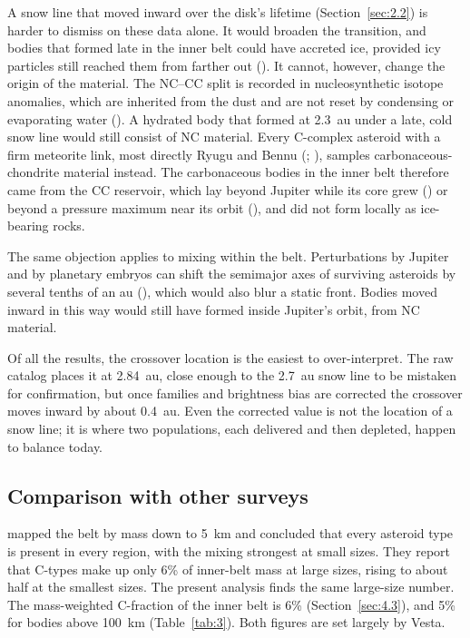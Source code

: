 \documentclass[twocolumn]{aastex701}
\begin{document}
A snow line that moved inward over the disk’s lifetime (Section~\ref{sec:2.2}) is harder to dismiss on these data alone. It would broaden the transition, and bodies that formed late in the inner belt could have accreted ice, provided icy particles still reached them from farther out (\citealt{morbidelli2016}). It cannot, however, change the origin of the material. The NC–CC split is recorded in nucleosynthetic isotope anomalies, which are inherited from the dust and are not reset by condensing or evaporating water (\citealt{kleine2020}). A hydrated body that formed at 2.3~au under a late, cold snow line would still consist of NC material. Every C-complex asteroid with a firm meteorite link, most directly Ryugu and Bennu (\citealt{yokoyama2023}; \citealt{lauretta2024}), samples carbonaceous-chondrite material instead. The carbonaceous bodies in the inner belt therefore came from the CC reservoir, which lay beyond Jupiter while its core grew (\citealt{kruijer2017}) or beyond a pressure maximum near its orbit (\citealt{brasser2020}), and did not form locally as ice-bearing rocks.

The same objection applies to mixing within the belt. Perturbations by Jupiter and by planetary embryos can shift the semimajor axes of surviving asteroids by several tenths of an au (\citealt{petit2001}), which would also blur a static front. Bodies moved inward in this way would still have formed inside Jupiter’s orbit, from NC material.

Of all the results, the crossover location is the easiest to over-interpret. The raw catalog places it at 2.84~au, close enough to the 2.7~au snow line to be mistaken for confirmation, but once families and brightness bias are corrected the crossover moves inward by about 0.4~au. Even the corrected value is not the location of a snow line; it is where two populations, each delivered and then depleted, happen to balance today.

\subsection{Comparison with other surveys}\label{sec:5.2}
\citet{demeo2014} mapped the belt by mass down to 5~km and concluded that every asteroid type is present in every region, with the mixing strongest at small sizes. They report that C-types make up only 6\% of inner-belt mass at large sizes, rising to about half at the smallest sizes. The present analysis finds the same large-size number. The mass-weighted C-fraction of the inner belt is 6\% (Section~\ref{sec:4.3}), and 5\% for bodies above 100~km (Table~\ref{tab:3}). Both figures are set largely by Vesta.
\end{document}
